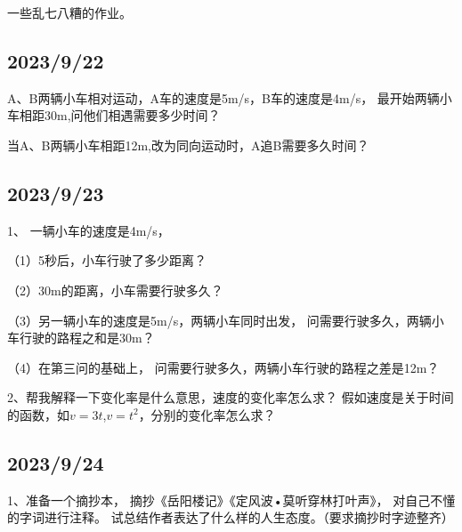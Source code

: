 \documentclass[cn,12pt]{elegantbook}
\begin{document}
一些乱七八糟的作业。
  \subsection*{2023/9/22}

    \vspace{3em}
    \vspace{3em}
    
  A、B两辆小车相对运动，A车的速度是5m/s，B车的速度是4m/s，
  最开始两辆小车相距30m,问他们相遇需要多少时间？
  \vspace{3em}


    \vspace{3em}

  当A、B两辆小车相距12m,改为同向运动时，A追B需要多久时间？


     \subsection*{2023/9/23}
     
     1、 一辆小车的速度是4m/s，
      
      （1）5秒后，小车行驶了多少距离？

      （2）30m的距离，小车需要行驶多久？
        
      （3）另一辆小车的速度是5m/s，两辆小车同时出发，
      问需要行驶多久，两辆小车行驶的路程之和是30m？

      （4）在第三问的基础上，
      问需要行驶多久，两辆小车行驶的路程之差是12m？
       
      2、帮我解释一下变化率是什么意思，速度的变化率怎么求？
        假如速度是关于时间的函数，如$v=3t$,$v=t^2$，分别的变化率怎么求？

     \subsection*{2023/9/24}
      
      1、准备一个摘抄本，
       摘抄《岳阳楼记》《定风波•莫听穿林打叶声》，
       对自己不懂的字词进行注释。
       试总结作者表达了什么样的人生态度。（要求摘抄时字迹整齐）
       
\end{document}
